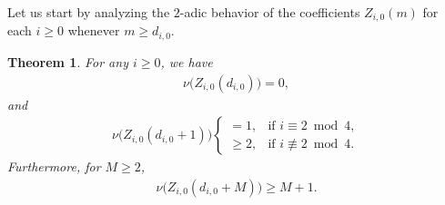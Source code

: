 \documentclass[12pt,reqno]{amsart}
\numberwithin{equation}{section}
\theoremstyle{theorem}
\newtheorem{theorem}{Theorem}
\theoremstyle{definition}
\begin{document}
Let us start by analyzing the $2$-adic behavior of the coefficients $Z_{i,0}(m)$ for each $i\ge 0$ whenever $m\ge d_{i,0}$.

\begin{theorem}\label{th:2-adic-Z-i-0}
	For any $i\ge 0$, we have
	\begin{align*}%
		\nu\big(Z_{i,0}(d_{i,0})\big) = 0,
	\end{align*}
	and
	\begin{align*} %
		\nu\big(Z_{i,0}(d_{i,0}+1)\big) \begin{cases}
			= 1, & \text{if $i\equiv 2 \bmod{4}$},\\
			\ge 2, & \text{if $i\not\equiv 2 \bmod{4}$}.
		\end{cases}
	\end{align*}
	Furthermore, for $M\ge 2$,
	\begin{align*} %
		\nu\big(Z_{i,0}(d_{i,0}+M)\big) \ge M+1.
	\end{align*}
\end{theorem}
\end{document}
